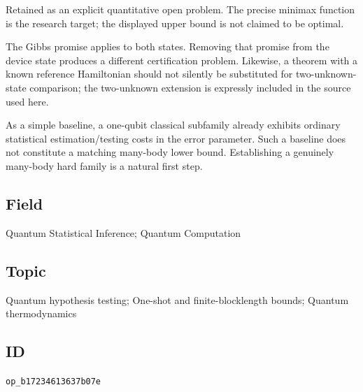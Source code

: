 Retained as an explicit quantitative open problem. The precise minimax function is the research target; the displayed upper bound is not claimed to be optimal.

The Gibbs promise applies to both states. Removing that promise from the device state produces a different certification problem. Likewise, a theorem with a known reference Hamiltonian should not silently be substituted for two-unknown-state comparison; the two-unknown extension is expressly included in the source used here.

As a simple baseline, a one-qubit classical subfamily already exhibits ordinary statistical estimation/testing costs in the error parameter. Such a baseline does not constitute a matching many-body lower bound. Establishing a genuinely many-body hard family is a natural first step.

\subsection*{Field}

Quantum Statistical Inference; Quantum Computation

\subsection*{Topic}

Quantum hypothesis testing; One-shot and finite-blocklength bounds; Quantum thermodynamics

\subsection*{ID}

\texttt{op\_b17234613637b07e}
